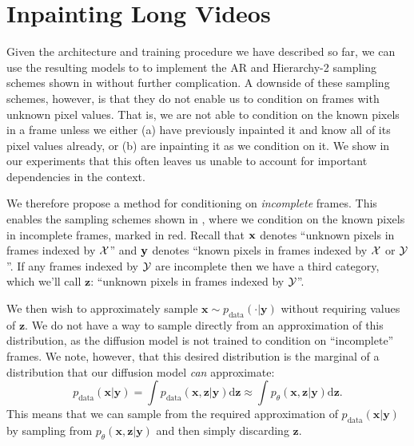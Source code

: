 \section{Inpainting Long Videos} \label{sec:future-conditioning}
Given the architecture and training procedure we have described so far, we can use the resulting models to to implement the AR and Hierarchy-2 sampling schemes shown in  without further complication. A downside of these sampling schemes, however, is that they do not enable us to condition on frames with unknown pixel values. That is, we are not able to condition on the known pixels in a frame unless we either (a) have previously inpainted it and know all of its pixel values already, or (b) are inpainting it as we condition on it. We show in our experiments that this often leaves us unable to account for important dependencies in the context.



We therefore propose a method for conditioning on \textit{incomplete} frames. This enables the sampling schemes shown in , where we condition on the known pixels in incomplete frames, marked in \textcolor{observedfuturecolor}{red}. Recall that $\mathbf{x}$ denotes ``unknown pixels in frames indexed by $\mathcal{X}$'' and $\mathbf{y}$ denotes ``known pixels in frames indexed by $\mathcal{X}$ or $\mathcal{Y}$''. If any frames indexed by $\mathcal{Y}$ are incomplete then we have a third category, which we'll call $\mathbf{z}$: ``unknown pixels in frames indexed by $\mathcal{Y}$''.


We then wish to approximately sample $\mathbf{x} \sim p_\text{data}(\cdot | \mathbf{y})$ without requiring values of $\mathbf{z}$. We do not have a way to sample directly from an approximation of this distribution, as the diffusion model is not trained to condition on ``incomplete'' frames. We note, however, that this desired distribution is the marginal of a distribution that our diffusion model \textit{can} approximate:
\begin{equation}
    p_\text{data}(\mathbf{x}|\mathbf{y}) = \int p_\text{data}(\mathbf{x},\mathbf{z}|\mathbf{y}) \mathrm{d}\mathbf{z} \approx \int p_\theta(\mathbf{x},\mathbf{z}|\mathbf{y}) \mathrm{d}\mathbf{z}.
\end{equation}
This means that we can sample from the required approximation of $p_\text{data}(\mathbf{x}|\mathbf{y})$ by sampling from $p_\theta(\mathbf{x},\mathbf{z}|\mathbf{y})$ and then simply discarding $\mathbf{z}$.

